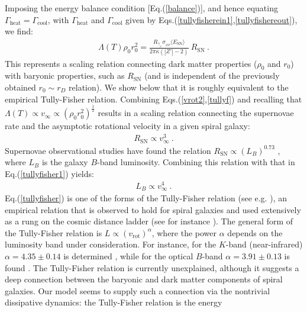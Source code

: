\documentclass[12pt]{article}
\begin{document}
{{Imposing the energy balance condition [Eq.(\ref{balance})], and hence
equating $\Gamma _{\text{heat}} = \Gamma _{\text{cool}}$, with $\Gamma
_{\text{heat}}$ and $\Gamma _{\text{cool}}$ given by
Eqs.(\ref{tullyfisherein1},\ref{tullyfishereout}), we find:
%
\begin{eqnarray}
\Lambda (T)\rho _0 r _0 ^2 = \frac{R _{\gamma _{_D}}\sigma
_{_{DP}}\langle E _{\text{SN}} \rangle}{2\pi \kappa (|Z'|-2)} \ R
_{\text{SN}} \ .
\label{tullyf}
\end{eqnarray}
%
This represents a scaling relation connecting dark matter properties
($\rho _0$ and $ r_0$) with baryonic properties, such as $R
_{\text{SN}}$ (and is independent of the previously obtained $r _0 \sim
r _D$ relation). We show below that it is roughly equivalent to the
empirical Tully-Fisher relation. Combining
Eqs.(\ref{vrot2},\ref{tullyf}) and recalling that $\Lambda (T) \propto v
_{\infty} \propto \left ( \rho _0 r _0 ^2 \right ) ^{\frac{1}{2}}$
results in a scaling relation connecting the supernovae rate and the
asymptotic rotational velocity in a given spiral galaxy:
%
\begin{eqnarray}
R _{\text{SN}} \propto v _{\infty} ^3 \ .
\label{tullyfisher1}
\end{eqnarray}
%
Supernovae observational studies have found the relation $R _{\text{SN}}
\propto \left ( L _B \right ) ^{0.73}$ \cite{wli}, where $L _B$ is the
galaxy $B$-band luminosity. Combining this relation with that in
Eq.(\ref{tullyfisher1}) yields:
%
\begin{eqnarray}
L _B \propto v _{\infty} ^4 \ .
\label{tullyfisher}
\end{eqnarray}
%
Eq.(\ref{tullyfisher}) is one of the forms of the Tully-Fisher relation
(see e.g. \cite{webster}), an empirical 
relation that is observed to hold for spiral galaxies \cite{tully} and
used extensively as a rung on the 
cosmic distance ladder (see for instance \cite{maoz}). The general form
of the Tully-Fisher relation is $L \propto \left ( v _{\text{rot}}
\right ) ^{\alpha}$, where the power $\alpha$ depends on the luminosity
band under consideration. For instance, for the $K$-band (near-infrared)
$\alpha = 4.35 \pm 0.14$ is determined \cite{webster}, while for the
optical $B$-band $\alpha = 3.91 \pm 0.13$ is found \cite{webster}. The
Tully-Fisher relation is currently unexplained, although it suggests a
deep connection between the baryonic and dark matter components of
spiral galaxies. Our model seems to supply such a connection via the
nontrivial dissipative dynamics: the Tully-Fisher relation is the energy
}}
\end{document}
